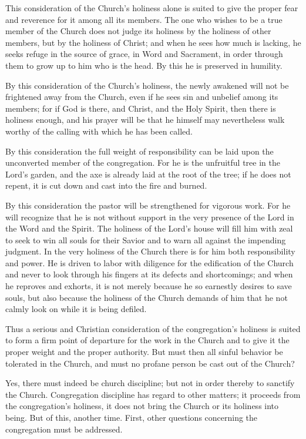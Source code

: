 This consideration of the Church’s holiness alone is suited to give the proper fear and reverence for it among all its members. The one who wishes to be a true member of the Church does not judge its holiness by the holiness of other members, but by the holiness of Christ; and when he sees how much is lacking, he seeks refuge in the source of grace, in Word and Sacrament, in order through them to grow up to him who is the head. By this he is preserved in humility.

By this consideration of the Church’s holiness, the newly awakened will not be frightened away from the Church, even if he sees sin and unbelief among its members; for if God is there, and Christ, and the Holy Spirit, then there is holiness enough, and his prayer will be that he himself may nevertheless walk worthy of the calling with which he has been called.

By this consideration the full weight of responsibility can be laid upon the unconverted member of the congregation. For he is the unfruitful tree in the Lord’s garden, and the axe is already laid at the root of the tree; if he does not repent, it is cut down and cast into the fire and burned.

By this consideration the pastor will be strengthened for vigorous work. For he will recognize that he is not without support in the very presence of the Lord in the Word and the Spirit. The holiness of the Lord’s house will fill him with zeal to seek to win all souls for their Savior and to warn all against the impending judgment. In the very holiness of the Church there is for him both responsibility and power. He is driven to labor with diligence for the edification of the Church and never to look through his fingers at its defects and shortcomings; and when he reproves and exhorts, it is not merely because he so earnestly desires to save souls, but also because the holiness of the Church demands of him that he not calmly look on while it is being defiled.

Thus a serious and Christian consideration of the congregation’s holiness is suited to form a firm point of departure for the work in the Church and to give it the proper weight and the proper authority. But must then all sinful behavior be tolerated in the Church, and must no profane person be cast out of the Church?

Yes, there must indeed be church discipline; but not in order thereby to sanctify the Church. Congregation discipline has regard to other matters; it proceeds from the congregation’s holiness, it does not bring the Church or its holiness into being. But of this, another time. First, other questions concerning the congregation must be addressed.


